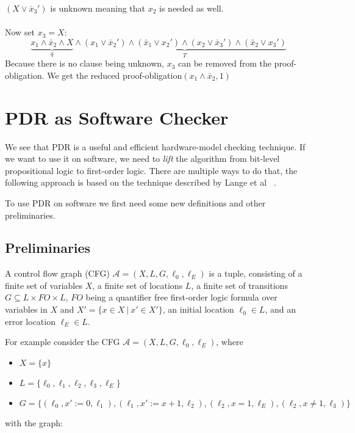 \documentclass[11pt, a4paper, BCOR=10mm, ngerman]{scrbook}
\begin{document}
$(X \lor \bar x_3')$ is unknown meaning that $x_2$  is needed as well. \\ \\

Now set $x_3 = X$: \\
\begin{equation*}
\underbrace{x_1 \land \bar x_2 \land X}_{q} \land \underbrace{(x_1 \lor \bar x_2' ) \land ( \bar x_1 \lor x_2') \land (x_2 \lor \bar x_3') \land ( \bar x_2 \lor x_3')}_{T}
\end{equation*}
Because there is no clause being unknown, $x_3$ can be removed from the proof-obligation. We get the reduced proof-obligation$(x_1 \land \bar x_2, 1)$

\pagebreak


\chapter{PDR as Software Checker} \label{sec3}
We see that PDR is a useful and efficient hardware-model checking technique. If we want to use it on software, we need to \textsl{lift} the algorithm from bit-level propositional logic to first-order logic. There are multiple ways to do that, the following approach is based on the technique described by Lange et al ~\cite{DBLP:conf/fmcad/0001NN15}. \par To use PDR on software we first need some new definitions and other preliminaries.

\section{Preliminaries}
A control flow graph (CFG) $\mathcal{A} = (X, L, G, \ell_0, \ell_E)$ is a tuple, consisting of a finite set of variables $X$, a finite set of locations $L$, a finite set of transitions $G \subseteq L \times FO \times L$, $FO$ being a quantifier free first-order logic formula over variables in $X$ and $X' = \{x \in X \ | \ x' \in X'\}$, an initial location $\ell_0 \in L$, and an error location $\ell_E \in L$.\par

For example consider the CFG $\mathcal{A} = (X, L, G, \ell_0, \ell_E)$, where
\begin{itemize}
\item $X = \{x\}$
\item $L = \{\ell_0, \ell_1, \ell_2, \ell_3, \ell_E\}$
\item $G = \{(\ell_0, x' := 0, \ell_1), (\ell_1, x' := x + 1, \ell_2), (\ell_2, x = 1, \ell_E), (\ell_2, x \neq 1, \ell_3) \} $
\end{itemize}
\pagebreak
with the graph: \\
\end{document}
